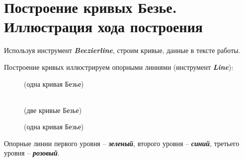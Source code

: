 \section[Построение кривых Безье. Иллюстрация хода построения]{Построение кривых Безье. Иллюстрация хода построения}
Используя инструмент \textit{\textbf{Beezierline}}, строим кривые, данные в тексте работы.

Построение кривых иллюстрируем опорными линиями (инструмент \textit{\textbf{Line}}):
\hspace{0pt}
\begin{figure}[H]
    \begin{minipage}[h]{0.333\linewidth}
         (одна кривая Безье) \\
    \end{minipage}
    \hfill
    \begin{minipage}[h]{0.47\linewidth}
         \\(две кривые Безье)
    \end{minipage}
    \hfill
    \center
    \begin{minipage}[h]{0.9\linewidth}
         (одна кривая Безье) \\
    \end{minipage}
\end{figure}

Опорные линии первого уровня -- \textbf{\textit{зеленый}}, 
второго уровня -- \textbf{\textit{синий}}, 
третьего уровня -- \textbf{\textit{розовый}}.
